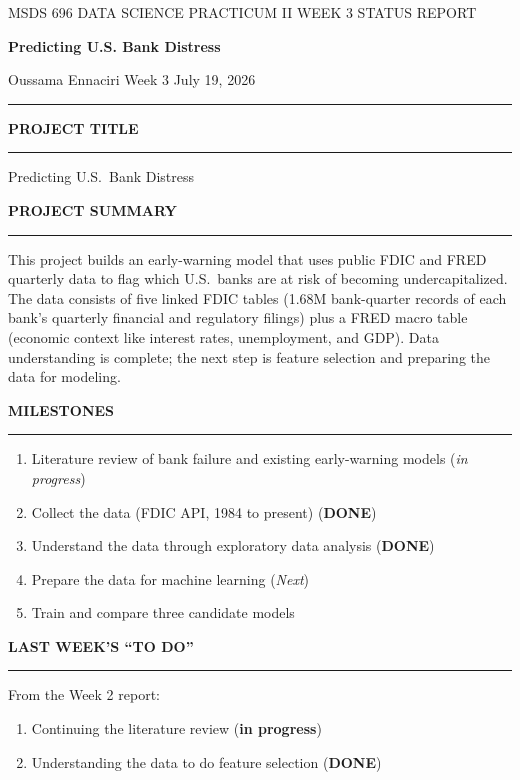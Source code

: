 \documentclass[11pt,letterpaper]{article}
\newcommand{\sectionhead}[1]{%
  \vspace{6pt}%
  {\sffamily\bfseries\fontsize{9.5}{12}\selectfont\color{navy}\MakeUppercase{#1}}\par
  \vspace{-9pt}\textcolor{hairline}{\rule{\textwidth}{0.5pt}}\par\vspace{0pt}}
\newcommand{\answer}[1]{#1\par\vspace{3pt}}
\begin{document}
\vspace*{-14pt}
{\sffamily\fontsize{8.5}{11}\selectfont\color{midgray}MSDS 696 DATA SCIENCE PRACTICUM II \quad\textbar\quad WEEK 3 STATUS REPORT}\par\vspace{10pt}
{\sffamily\bfseries\fontsize{21}{25}\selectfont\color{navy}Predicting U.S. Bank Distress}\par\vspace{9pt}
{\sffamily\fontsize{9}{12}\selectfont Oussama Ennaciri \quad\textbar\quad Week 3 \quad\textbar\quad July 19, 2026}\par\vspace{5pt}
\textcolor{navy}{\rule{\textwidth}{1.2pt}}

\sectionhead{Project title}
\answer{Predicting U.S.\ Bank Distress}

\sectionhead{Project summary}
\answer{This project builds an early-warning model that uses public FDIC and FRED quarterly data to flag which U.S.\ banks are at risk of becoming undercapitalized. The data consists of five linked FDIC tables (1.68M bank-quarter records of each bank's quarterly financial and regulatory filings) plus a FRED macro table (economic context like interest rates, unemployment, and GDP). Data understanding is complete; the next step is feature selection and preparing the data for modeling.}

\sectionhead{Milestones}
\answer{\begin{enumerate}[topsep=1pt,itemsep=1pt,leftmargin=16pt,label=\textcolor{navy}{\bfseries\arabic*.}]
  \item Literature review of bank failure and existing early-warning models (\textit{in progress})
  \item Collect the data (FDIC API, 1984 to present) (\textbf{DONE})
  \item Understand the data through exploratory data analysis (\textbf{DONE})
  \item Prepare the data for machine learning (\textit{Next})
  \item Train and compare three candidate models
\end{enumerate}}

\sectionhead{Last week's ``To Do''}
\answer{From the Week 2 report:
\begin{enumerate}[topsep=1pt,itemsep=1pt,leftmargin=16pt,label=\textcolor{navy}{\bfseries\arabic*.}]
  \item Continuing the literature review (\textbf{in progress})
  \item Understanding the data to do feature selection (\textbf{DONE})
\end{enumerate}}
\end{document}

